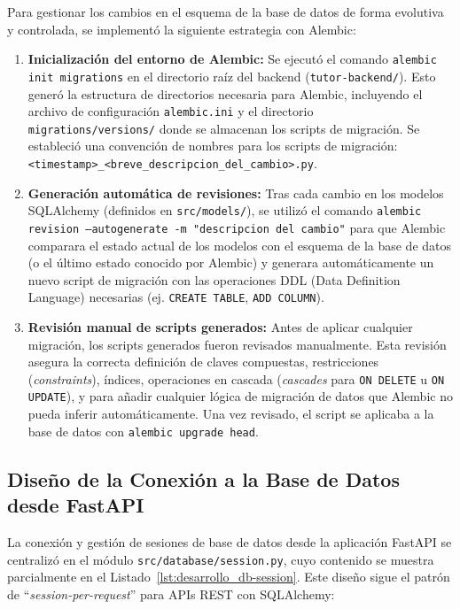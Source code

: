 Para gestionar los cambios en el esquema de la base de datos de forma evolutiva y controlada, se implementó la siguiente estrategia con Alembic:
\begin{enumerate}[leftmargin=*]
  \item \textbf{Inicialización del entorno de Alembic:} Se ejecutó el comando \texttt{alembic init migrations} en el directorio raíz del backend (\texttt{tutor-backend/}). Esto generó la estructura de directorios necesaria para Alembic, incluyendo el archivo de configuración \texttt{alembic.ini} y el directorio\\ \texttt{migrations/versions/} donde se almacenan los scripts de migración. Se estableció una convención de nombres para los scripts de migración: \texttt{<timestamp>\_<breve\_descripcion\_del\_cambio>.py}.
  \item \textbf{Generación automática de revisiones:} Tras cada cambio en los modelos SQLAlchemy (definidos en \texttt{src/models/}), se utilizó el comando \texttt{alembic revision --autogenerate -m "descripcion del cambio"} para que Alembic comparara el estado actual de los modelos con el esquema de la base de datos (o el último estado conocido por Alembic) y generara automáticamente un nuevo script de migración con las operaciones DDL (Data Definition Language) necesarias (ej. \texttt{CREATE TABLE}, \texttt{ADD COLUMN}).
  \item \textbf{Revisión manual de scripts generados:} Antes de aplicar cualquier migración, los scripts generados fueron revisados manualmente. Esta revisión asegura la correcta definición de claves compuestas, restricciones (\emph{constraints}), índices, operaciones en cascada (\emph{cascades} para \texttt{ON DELETE} u \texttt{ON UPDATE}), y para añadir cualquier lógica de migración de datos que Alembic no pueda inferir automáticamente. Una vez revisado, el script se aplicaba a la base de datos con \texttt{alembic upgrade head}.
\end{enumerate}

\subsection{Diseño de la Conexión a la Base de Datos desde FastAPI}
\label{ssec:desarrollo_iter1_conexion}

La conexión y gestión de sesiones de base de datos desde la aplicación FastAPI se centralizó en el módulo \texttt{src/database/session.py}, cuyo contenido se muestra parcialmente en el Listado~\ref{lst:desarrollo_db-session}. Este diseño sigue el patrón de “\emph{session-per-request}” para APIs REST con SQLAlchemy:

